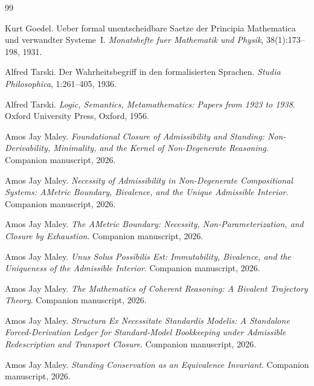 \documentclass[11pt]{article}
\theoremstyle{plain}
\theoremstyle{definition}
\begin{document}
\begin{thebibliography}{99}

Kurt Goedel.
\newblock Ueber formal unentscheidbare Saetze der Principia Mathematica und verwandter Systeme~I.
\newblock \emph{Monatshefte fuer Mathematik und Physik}, 38(1):173--198, 1931.

Alfred Tarski.
\newblock Der Wahrheitsbegriff in den formalisierten Sprachen.
\newblock \emph{Studia Philosophica}, 1:261--405, 1936.

Alfred Tarski.
\newblock \emph{Logic, Semantics, Metamathematics: Papers from 1923 to 1938}.
\newblock Oxford University Press, Oxford, 1956.

Amos Jay Maley.
\newblock \emph{Foundational Closure of Admissibility and Standing: Non-Derivability, Minimality, and the Kernel of Non-Degenerate Reasoning}.
\newblock Companion manuscript, 2026.

Amos Jay Maley.
\newblock \emph{Necessity of Admissibility in Non-Degenerate Compositional Systems: AMetric Boundary, Bivalence, and the Unique Admissible Interior}.
\newblock Companion manuscript, 2026.

Amos Jay Maley.
\newblock \emph{The AMetric Boundary: Necessity, Non-Parameterization, and Closure by Exhaustion}.
\newblock Companion manuscript, 2026.

Amos Jay Maley.
\newblock \emph{Unus Solus Possibilis Est: Immutability, Bivalence, and the Uniqueness of the Admissible Interior}.
\newblock Companion manuscript, 2026.

Amos Jay Maley.
\newblock \emph{The Mathematics of Coherent Reasoning: A Bivalent Trajectory Theory}.
\newblock Companion manuscript, 2026.

Amos Jay Maley.
\newblock \emph{Structura Ex Necessitate Standardis Modelis: A Standalone Forced-Derivation Ledger for Standard-Model Bookkeeping under Admissible Redescription and Transport Closure}.
\newblock Companion manuscript, 2026.

Amos Jay Maley.
\newblock \emph{Standing Conservation as an Equivalence Invariant}.
\newblock Companion manuscript, 2026.

\end{thebibliography}
\end{document}
